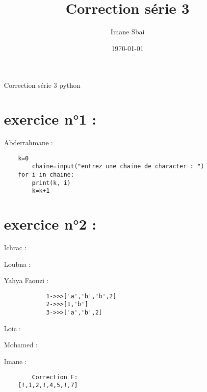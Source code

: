 \documentclass{article}
\title{Correction série 3}
\author{Imane Sbai}
\date {\today}
\begin{document}
\begin{titlepage}
    \begin{center}
Correction s\'{e}rie 3 python
    \end{center}
\end{titlepage}

\section{exercice n°1 :}
	\begin{center}
    		Abderrahmane :
	\end{center} 
	
	\begin{verbatim}
	k=0
    	chaine=input("entrez une chaine de character : ")
	for i in chaine:
   		print(k, i)
	   	k=k+1
	\end{verbatim}
\section{exercice n°2 :}

	\begin{center}
    		Ichrac :
	\end{center}
	
	
	\begin{center}
    		Loubna :
	\end{center} 
	

        \begin{center}
    		 Yahya Faouzi :
	\end{center}    	  
        	
    	\begin{verbatim}
        	1->>>['a','b','b',2]
	    	2->>>[1,'b']
	    	3->>>['a','b',2]
        \end{verbatim}
         
	\begin{center}
    		Loic :
	\end{center} 
	
	
	\begin{center}
    		Mohamed :
	\end{center}
	

	\begin{center}
    		Imane :
        \end{center} 
	
	\begin{verbatim}
		Correction F:
	[!,1,2,!,4,5,!,7]

	\end{verbatim}
	
\end{document}
